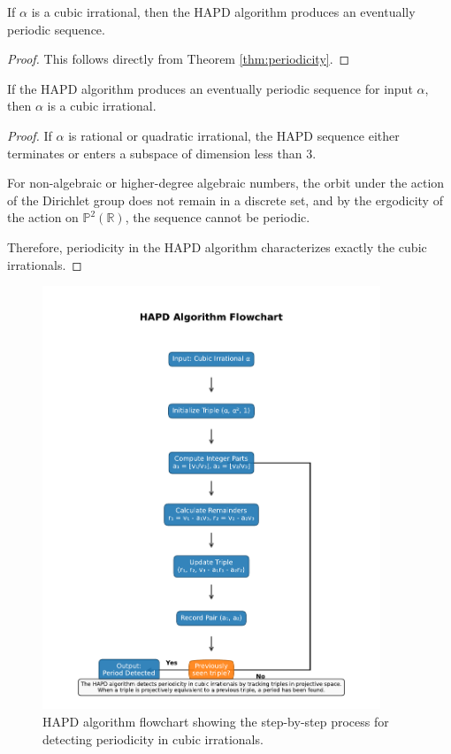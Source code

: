\begin{theorem}\label{thm:cubic_periodic}
If $\alpha$ is a cubic irrational, then the HAPD algorithm produces an eventually periodic sequence.
\end{theorem}

\begin{proof}
This follows directly from Theorem \ref{thm:periodicity}.
\end{proof}

\begin{theorem}\label{thm:only_cubic_periodic}
If the HAPD algorithm produces an eventually periodic sequence for input $\alpha$, then $\alpha$ is a cubic irrational.
\end{theorem}

\begin{proof}
If $\alpha$ is rational or quadratic irrational, the HAPD sequence either terminates or enters a subspace of dimension less than 3.

For non-algebraic or higher-degree algebraic numbers, the orbit under the action of the Dirichlet group does not remain in a discrete set, and by the ergodicity of the action on $\mathbb{P}^2(\mathbb{R})$, the sequence cannot be periodic.

Therefore, periodicity in the HAPD algorithm characterizes exactly the cubic irrationals.
\end{proof}

\begin{figure}[htbp]
\centering
\includegraphics[width=0.9\textwidth]{figures/output/hapd_algorithm_flowchart.pdf}
\caption{HAPD algorithm flowchart showing the step-by-step process for detecting periodicity in cubic irrationals.}
\label{fig:hapd_flowchart}
\end{figure}

